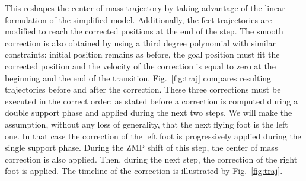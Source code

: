 %
%
This reshapes the center of mass trajectory by taking advantage of the
linear formulation of the simplified model. Additionally, the feet
trajectories are modified to reach the corrected positions at the end
of the step. The smooth correction is also obtained by using a third
degree polynomial with similar constraints: initial position remains
as before, the goal position must fit the corrected position and the
velocity of the correction is equal to zero at the beginning and the
end of the transition. Fig.~\ref{fig:traj} compares resulting
trajectories before and after the correction.
%
%
These three corrections must be executed in the correct order: as
stated before a correction is computed during a double support phase
and applied during the next two steps. We will make the assumption,
without any loss of generality, that the next flying foot is the left
one. In that case the correction of the left foot is progressively
applied during the single support phase. During the ZMP shift of this
step, the center of mass correction is also applied. Then, during the
next step, the correction of the right foot is applied. The timeline
of the correction is illustrated by Fig.~\ref{fig:traj}.
%
%
